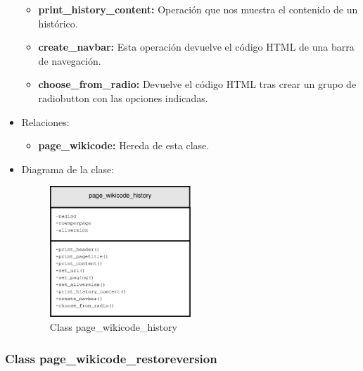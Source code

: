 \begin{itemize}
\begin{itemize}
			\item \textbf{print\_history\_content: }Operación que nos muestra el contenido de un histórico.
			\item \textbf{create\_navbar: }Esta operación devuelve el código HTML de una barra de navegación.
			\item \textbf{choose\_from\_radio:} Devuelve el código HTML tras crear un grupo de radiobutton con las opciones indicadas.
		\end{itemize}
	\item Relaciones:
		\begin{itemize}
			\item \textbf{page\_wikicode:} Hereda de esta clase.
		\end{itemize}
	\item Diagrama de la clase:
		\begin{figure}[h]
			\centering
			\includegraphics[width=0.5\textwidth]{./img/page_wikicode_history.eps}
			\caption{Class page\_wikicode\_history}
		\end{figure}
\end{itemize}

\subsubsection{Class page\_wikicode\_restoreversion}

